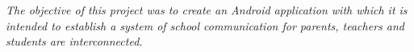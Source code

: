%
%
%
%

\newpage  %
\begin{summary}
	{\em
		The objective of this project was to create an Android application with which it is intended to establish a system of school communication for parents, teachers and students are interconnected.	
	}
\end{summary}
